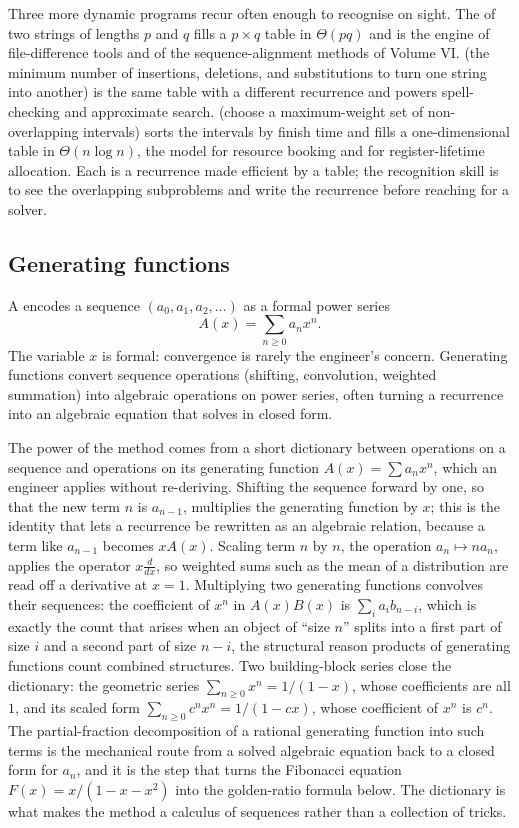 Three more dynamic programs recur often enough to recognise on
sight. The  of two strings of
lengths $p$ and $q$ fills a $p \times q$ table in $\Theta(pq)$ and
is the engine of file-difference tools and of the sequence-alignment
methods of Volume VI.  (the minimum number of
insertions, deletions, and substitutions to turn one string into
another) is the same table with a different recurrence and powers
spell-checking and approximate search.  (choose a maximum-weight set of non-overlapping
intervals) sorts the intervals by finish time and fills a
one-dimensional table in $\Theta(n \log n)$, the model for resource
booking and for register-lifetime allocation. Each is a recurrence
made efficient by a table; the recognition skill is to see the
overlapping subproblems and write the recurrence before reaching for
a solver.

\subsection{Generating functions}

A  encodes a sequence $(a_{0}, a_{1},
a_{2}, \ldots)$ as a formal power series
\[
A(x) = \sum_{n \geq 0} a_{n} x^{n}.
\]
The variable $x$ is formal: convergence is rarely the engineer's
concern. Generating functions convert sequence operations
(shifting, convolution, weighted summation) into algebraic
operations on power series, often turning a recurrence into an
algebraic equation that solves in closed form.

The power of the method comes from a short dictionary between
operations on a sequence and operations on its generating function
$A(x) = \sum a_{n} x^{n}$, which an engineer applies without
re-deriving. Shifting the sequence forward by one, so that the new
term $n$ is $a_{n-1}$, multiplies the generating function by $x$;
this is the identity that lets a recurrence be rewritten as an
algebraic relation, because a term like $a_{n-1}$ becomes $x A(x)$.
Scaling term $n$ by $n$, the operation $a_{n} \mapsto n a_{n}$,
applies the operator $x \frac{d}{dx}$, so weighted sums such as the
mean of a distribution are read off a derivative at $x = 1$.
Multiplying two generating functions convolves their sequences: the
coefficient of $x^{n}$ in $A(x) B(x)$ is $\sum_{i} a_{i} b_{n-i}$,
which is exactly the count that arises when an object of ``size $n$''
splits into a first part of size $i$ and a second part of size
$n - i$, the structural reason products of generating functions count
combined structures. Two building-block series close the dictionary:
the geometric series $\sum_{n \geq 0} x^{n} = 1/(1 - x)$, whose
coefficients are all $1$, and its scaled form $\sum_{n \geq 0} c^{n}
x^{n} = 1/(1 - c x)$, whose coefficient of $x^{n}$ is $c^{n}$. The
partial-fraction decomposition of a rational generating function into
such terms is the mechanical route from a solved algebraic equation
back to a closed form for $a_{n}$, and it is the step that turns the
Fibonacci equation $F(x) = x/(1 - x - x^{2})$ into the golden-ratio
formula below. The dictionary is what makes the method a calculus of
sequences rather than a collection of tricks.

